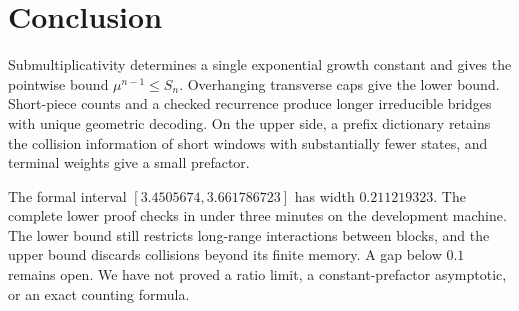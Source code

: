 \documentclass[conference]{IEEEtran}
\begin{document}
\section{Conclusion}

Submultiplicativity determines a single exponential growth constant
and gives the pointwise bound $\mu^{n-1}\leq S_n$.
Overhanging transverse caps give the lower bound. Short-piece counts
and a checked recurrence produce longer irreducible bridges with
unique geometric decoding. On the upper side, a prefix dictionary retains
the collision information of short windows with substantially fewer
states, and terminal weights give a small prefactor.

The formal interval $[3.4505674,3.661786723]$ has width
$0.211219323$. The complete lower proof checks in under three minutes
on the development machine.
The lower bound still restricts long-range
interactions between blocks, and the upper bound discards collisions
beyond its finite memory. A gap below $0.1$ remains open.
We have not proved a ratio limit, a constant-prefactor asymptotic,
or an exact counting formula.



\end{document}
